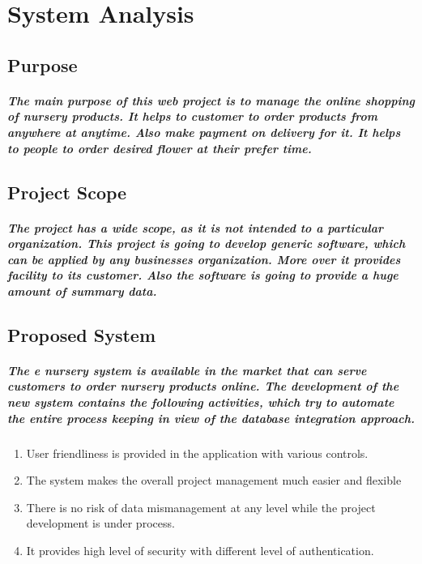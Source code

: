 \documentclass[12pt]{report}
\begin{document}
    \chapter{System Analysis}
        \section{Purpose}
        \paragraph
        {
        The main purpose of this web project is to manage the online shopping of nursery products. It helps to customer to order products from anywhere at anytime. Also make payment on delivery for it. It helps to people to order desired flower at their prefer time.
        }
        \section{Project Scope}
        \paragraph
        {
        The project has a wide scope, as it is not intended to a particular organization. This project is going to develop generic software, which can be applied by any businesses organization. More over it provides facility to its customer. Also the software is going to provide a huge amount of summary data.
        }
        \section{Proposed System}
        \paragraph
        {
        The e nursery system is available in the market that can serve customers to order nursery products online.  The development of the new system contains the following activities, which try to automate the entire process keeping in view of the database integration approach.
        }
        \begin{enumerate}
            \item User friendliness is provided in the application with various controls.
            
            \item The system makes the overall project management much easier and flexible
            
            \item There is no risk of data mismanagement at any level while the project development is under process.
            
            \item It provides high level of security with different level of authentication.
        \end{enumerate}
\end{document}
